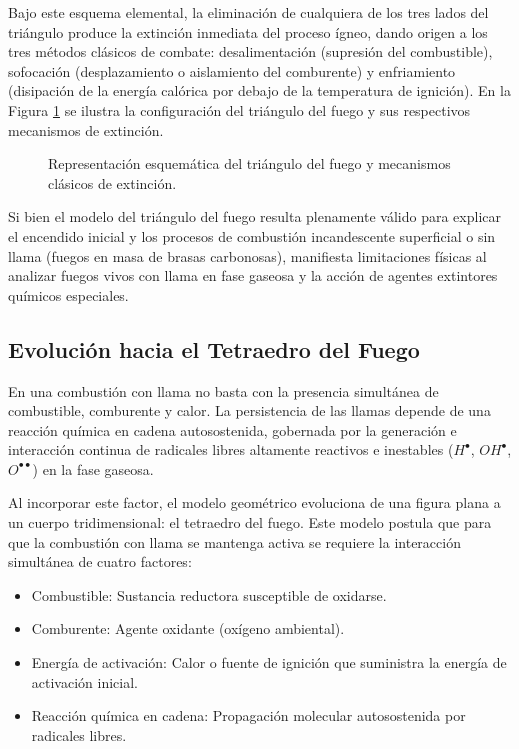 Bajo este esquema elemental, la eliminación de cualquiera de los tres lados del triángulo produce la extinción inmediata
del proceso ígneo, dando origen a los tres métodos clásicos de combate: desalimentación (supresión del combustible),
sofocación (desplazamiento o aislamiento del comburente) y enfriamiento (disipación de la energía calórica por debajo de
la temperatura de ignición). En la Figura \ref{fig.cap2:triangulo} se ilustra la configuración del triángulo del fuego y
sus respectivos mecanismos de extinción.

\begin{figure}[!ht]
    \centering
    
    \caption{Representación esquemática del triángulo del fuego y mecanismos clásicos de extinción.}
    \label{fig.cap2:triangulo}
\end{figure}

Si bien el modelo del triángulo del fuego resulta plenamente válido para explicar el encendido inicial y los procesos
de combustión incandescente superficial o sin llama (fuegos en masa de brasas carbonosas), manifiesta limitaciones
físicas al analizar fuegos vivos con llama en fase gaseosa y la acción de agentes extintores químicos especiales.

\subsection{Evolución hacia el Tetraedro del Fuego}

En una combustión con llama no basta con la presencia simultánea de
combustible, comburente y calor. La persistencia de las llamas depende de una reacción química en cadena autosostenida,
gobernada por la generación e interacción continua de radicales libres altamente reactivos e inestables ($H^\bullet$,
$OH^\bullet$, $O^{\bullet\bullet}$) en la fase gaseosa.

Al incorporar este factor, el modelo geométrico evoluciona de una figura plana a un cuerpo
tridimensional: el tetraedro del fuego. Este modelo postula que para que la combustión con llama se mantenga activa se
requiere la interacción simultánea de cuatro factores:
\begin{itemize}
    \item Combustible: Sustancia reductora susceptible de oxidarse.
    \item Comburente: Agente oxidante (oxígeno ambiental).
    \item Energía de activación: Calor o fuente de ignición que suministra la energía de activación inicial.
    \item Reacción química en cadena: Propagación molecular autosostenida por radicales libres.
\end{itemize}

